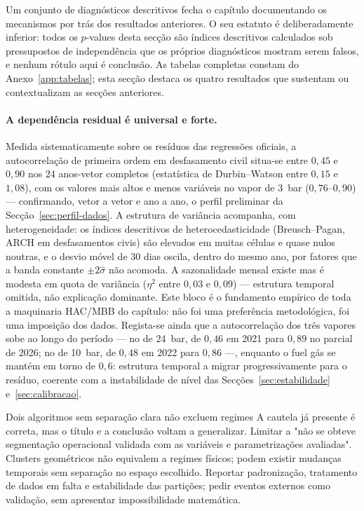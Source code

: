 
Um conjunto de diagnósticos descritivos fecha o capítulo documentando os
mecanismos por trás dos resultados anteriores. O seu estatuto é
deliberadamente inferior: todos os $p$-values desta secção são índices
descritivos calculados sob pressupostos de independência que os próprios
diagnósticos mostram serem falsos, e nenhum rótulo aqui é conclusão. As tabelas completas constam do Anexo~\ref{app:tabelas};
esta secção destaca os quatro resultados que sustentam ou contextualizam as
secções anteriores.

\paragraph{A dependência residual é universal e forte.} Medida
sistematicamente sobre os resíduos das regressões oficiais, a autocorrelação
de primeira ordem em desfasamento civil situa-se entre $0{,}45$ e $0{,}90$
nos 24 anos-vetor completos (estatística de Durbin--Watson entre $0{,}15$ e
$1{,}08$), com os valores mais altos e menos variáveis no vapor de 3~bar
($0{,}76$--$0{,}90$) --- confirmando, vetor a vetor e ano a ano, o perfil
preliminar da Secção~\ref{sec:perfil-dados}. A estrutura de variância acompanha,
com heterogeneidade: os índices descritivos de heterocedasticidade
(Breusch--Pagan, ARCH em desfasamentos civis) são elevados em muitas células
e quase nulos noutras, e o desvio móvel de 30 dias oscila, dentro do mesmo
ano, por fatores que a banda constante $\pm 2\hat\sigma$ não acomoda. A sazonalidade mensal existe mas é
modesta em quota de variância ($\eta^2$ entre $0{,}03$ e $0{,}09$) ---
estrutura temporal omitida, não explicação dominante. Este bloco é o
fundamento empírico de toda a maquinaria HAC/MBB do capítulo: não foi uma
preferência metodológica, foi uma imposição dos dados. Regista-se ainda que
a autocorrelação dos três vapores sobe ao longo do período --- no de
24~bar, de $0{,}46$ em 2021 para $0{,}89$ no parcial de 2026; no de 10~bar,
de $0{,}48$ em 2022 para $0{,}86$ ---, enquanto o fuel gás se mantém em
torno de $0{,}6$: estrutura temporal a migrar progressivamente para o
resíduo, coerente com a instabilidade de nível das
Secções~\ref{sec:estabilidade} e~\ref{sec:calibracao}.

{Dois algoritmos sem separação clara não excluem regimes}
{A cautela já presente é correta, mas o título e a conclusão voltam a
generalizar. Limitar a "não se obteve segmentação operacional validada
com as variáveis e parametrizações avaliadas". Clusters geométricos não
equivalem a regimes físicos; podem existir mudanças temporais sem
separação no espaço escolhido. Reportar padronização, tratamento de
dados em falta e estabilidade das partições; pedir eventos externos
como validação, sem apresentar impossibilidade matemática.}%
